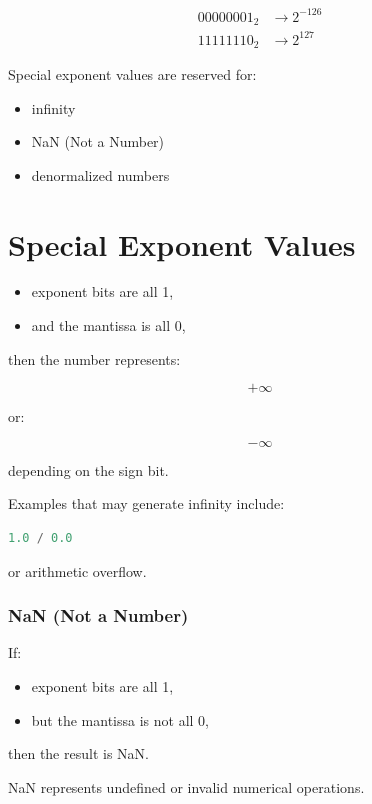 \documentclass[11pt]{article}
\begin{document}
\begin{align*}
00000001_2 &\rightarrow 2^{-126} \\
11111110_2 &\rightarrow 2^{127}
\end{align*}

Special exponent values are reserved for:

\begin{itemize}
    \item infinity
    \item NaN (Not a Number)
    \item denormalized numbers
\end{itemize}

\section{Special Exponent Values}

\begin{itemize}
    \item exponent bits are all 1,
    \item and the mantissa is all 0,
\end{itemize}

then the number represents:

\[
+\infty
\]

or:

\[
-\infty
\]

depending on the sign bit.

Examples that may generate infinity include:

\begin{lstlisting}[language=Python]
1.0 / 0.0
\end{lstlisting}

or arithmetic overflow.

\subsubsection{NaN (Not a Number)}

If:

\begin{itemize}
    \item exponent bits are all 1,
    \item but the mantissa is not all 0,
\end{itemize}

then the result is NaN.

NaN represents undefined or invalid numerical operations.
\end{document}
